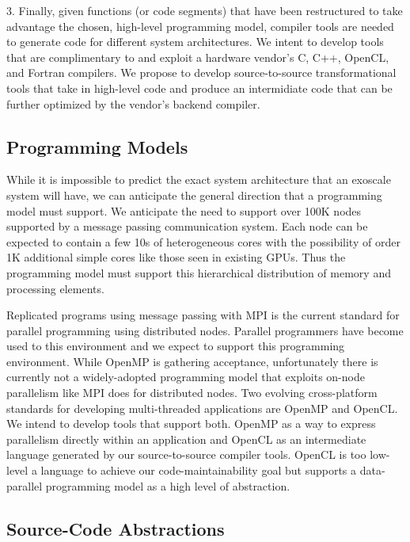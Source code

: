 3. Finally, given functions (or code segments) that have been restructured to
take advantage the chosen, high-level programming model, compiler tools are
needed to generate code for different system architectures.  We intent to
develop tools that are complimentary to and exploit a hardware vendor's C, C++,
OpenCL, and Fortran compilers.  We propose to develop source-to-source
transformational tools that take in high-level code and produce an intermidiate
code that can be further optimized by the vendor's backend compiler.

\subsection{Programming Models}

While it is impossible to predict the exact system architecture that an
exoscale system will have, we can anticipate the general direction that a
programming model must support.  We anticipate the need to support over 100K
nodes supported by a message passing communication system.  Each node can be
expected to contain a few 10s of heterogeneous cores with the possibility of
order 1K additional simple cores like those seen in existing GPUs.  Thus the
programming model must support this hierarchical distribution of
memory and processing elements.

Replicated programs using message passing with MPI is the current standard for
parallel programming using distributed nodes.  Parallel programmers have become
used to this environment and we expect to support this programming environment.  While
OpenMP is gathering acceptance, unfortunately there is currently not a
widely-adopted programming model that exploits on-node parallelism like MPI does
for distributed nodes.  Two evolving cross-platform standards for developing
multi-threaded applications are OpenMP and OpenCL.  We intend to develop tools
that support both.  OpenMP as a way to express parallelism directly within an
application and OpenCL as an intermediate language generated by our
source-to-source compiler tools.  OpenCL is too low-level a language to achieve our
code-maintainability goal but supports a data-parallel programming model as a
high level of abstraction.

\subsection{Source-Code Abstractions}

